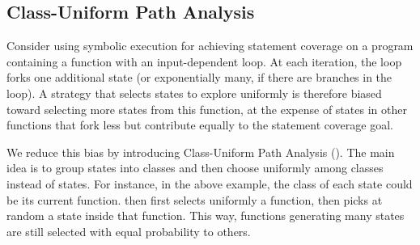 


\subsection{Class-Uniform Path Analysis}

Consider using symbolic execution for achieving statement coverage on a program containing a function with an input-dependent loop.  At each iteration, the loop forks one additional state (or exponentially many, if there are branches in the loop). A strategy that selects states to explore uniformly is therefore biased toward selecting more states from this function, at the expense of states in other functions that fork less but contribute equally to the statement coverage goal.

We reduce this bias by introducing Class-Uniform Path Analysis (\cupa).
%
The main idea is to group states into classes and then choose uniformly among classes instead of states.  For instance, in the above example, the class of each state could be its current function.  \cupa then first selects uniformly a function, then picks at random a state inside that function.  This way, functions generating many states are still selected with equal probability to others.

